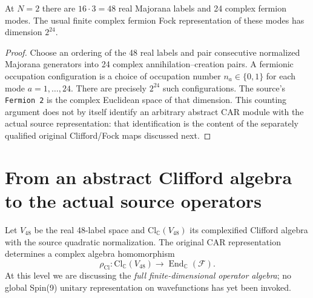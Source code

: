 \begin{sourceaccount}
At $N=2$ there are $16\cdot3=48$ real Majorana labels and 24 complex
fermion modes. The usual finite complex fermion Fock representation of
these modes has dimension $2^{24}$.
\end{sourceaccount}
\begin{proof}
Choose an ordering of the 48 real labels and pair consecutive normalized
Majorana generators into 24 complex annihilation--creation pairs. A
fermionic occupation configuration is a choice of occupation number
$n_a\in\{0,1\}$ for each mode $a=1,\dots,24$. There are precisely
$2^{24}$ such configurations. The source's \texttt{Fermion 2} is the complex
Euclidean space of that dimension. This counting argument does not by
itself identify an arbitrary abstract CAR module with the actual source
representation: that identification is the content of the separately
qualified original Clifford/Fock maps discussed next.
\end{proof}

\section{From an abstract Clifford algebra to the actual source operators}
Let $V_{48}$ be the real 48-label space and $\mathrm{Cl}_{\mathbb C}(V_{48})$
its complexified Clifford algebra with the source quadratic normalization.
The original CAR representation determines a complex algebra homomorphism
\begin{equation}\label{eq:clifford-fock-hom}
 \rho_{\mathrm{Cl}}:
 \mathrm{Cl}_{\mathbb C}(V_{48})\longrightarrow
 \operatorname{End}_{\mathbb C}(\mathcal F).
\end{equation}
At this level we are discussing the \emph{full finite-dimensional operator
algebra}; no global Spin(9) unitary representation on wavefunctions has yet
been invoked.

